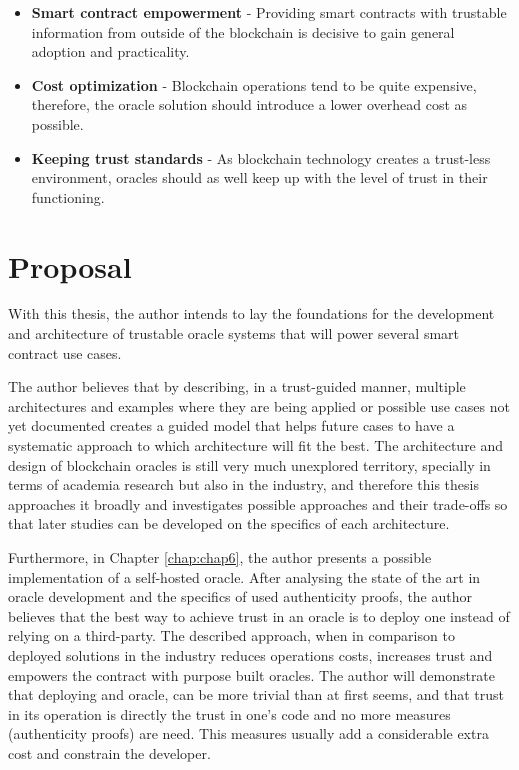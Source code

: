 
\begin{itemize}
    \item \textbf{Smart contract empowerment} - Providing smart contracts with trustable information from outside of the blockchain is decisive to gain general adoption and practicality.
    \item \textbf{Cost optimization} - Blockchain operations tend to be quite expensive, therefore, the oracle solution should introduce a lower overhead cost as possible.
    \item \textbf{Keeping trust standards} - As blockchain technology creates a trust-less environment, oracles should as well keep up with the level of trust in their functioning.
\end{itemize}

\section{Proposal}

With this thesis, the author intends to lay the foundations for the development and architecture of trustable oracle systems that will power several smart contract use cases.

The author believes that by describing, in a trust-guided manner, multiple architectures and examples where they are being applied or possible use cases not yet documented creates a guided model that helps future cases to have a systematic approach to which architecture will fit the best. The architecture and design of blockchain oracles is still very much unexplored territory, specially in terms of academia research but also in the industry, and therefore this thesis approaches it broadly and investigates possible approaches and their trade-offs so that later studies can be developed on the specifics of each architecture.

Furthermore, in Chapter \ref{chap:chap6}, the author presents a possible implementation of a self-hosted oracle. After analysing the state of the art in oracle development and the specifics of used authenticity proofs, the author believes that the best way to achieve trust in an oracle is to deploy one instead of relying on a third-party. The described approach, when in comparison to deployed solutions in the industry reduces operations costs, increases trust and empowers the contract with purpose built oracles. The author will demonstrate that deploying and oracle, can be more trivial than at first seems, and that trust in its operation is directly the trust in one's code and no more measures (authenticity proofs) are need. This measures usually add a considerable extra cost and constrain the developer.


